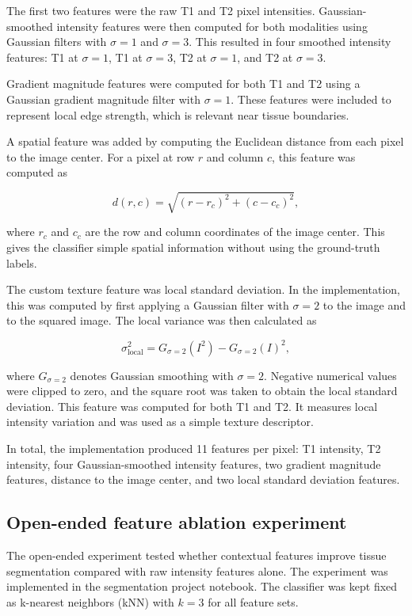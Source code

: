\documentclass[10pt,a4paper,twoside]{article}
\begin{document}
The first two features were the raw T1 and T2 pixel intensities. Gaussian-smoothed intensity features were then computed for both modalities using Gaussian filters with $\sigma = 1$ and $\sigma = 3$. This resulted in four smoothed intensity features: T1 at $\sigma = 1$, T1 at $\sigma = 3$, T2 at $\sigma = 1$, and T2 at $\sigma = 3$.

Gradient magnitude features were computed for both T1 and T2 using a Gaussian gradient magnitude filter with $\sigma = 1$. These features were included to represent local edge strength, which is relevant near tissue boundaries.

A spatial feature was added by computing the Euclidean distance from each pixel to the image center. For a pixel at row $r$ and column $c$, this feature was computed as

\[
d(r,c) = \sqrt{(r-r_c)^2 + (c-c_c)^2},
\]

where $r_c$ and $c_c$ are the row and column coordinates of the image center. This gives the classifier simple spatial information without using the ground-truth labels.

The custom texture feature was local standard deviation. In the implementation, this was computed by first applying a Gaussian filter with $\sigma = 2$ to the image and to the squared image. The local variance was then calculated as

\[
\sigma_{\mathrm{local}}^2 = G_{\sigma=2}(I^2) - G_{\sigma=2}(I)^2,
\]

where $G_{\sigma=2}$ denotes Gaussian smoothing with $\sigma = 2$. Negative numerical values were clipped to zero, and the square root was taken to obtain the local standard deviation. This feature was computed for both T1 and T2. It measures local intensity variation and was used as a simple texture descriptor.

In total, the implementation produced 11 features per pixel: T1 intensity, T2 intensity, four Gaussian-smoothed intensity features, two gradient magnitude features, distance to the image center, and two local standard deviation features.

\subsection{Open-ended feature ablation experiment}

The open-ended experiment tested whether contextual features improve tissue segmentation compared with raw intensity features alone. The experiment was implemented in the segmentation project notebook. The classifier was kept fixed as k-nearest neighbors (kNN) with $k=3$ for all feature sets.
\end{document}
